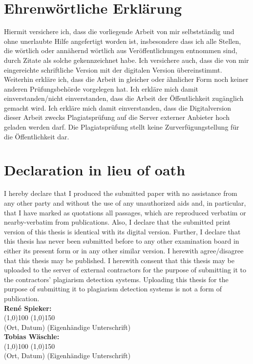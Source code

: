 \clearpage

\section*{Ehrenwörtliche Erklärung}
Hiermit versichere ich, dass die vorliegende Arbeit von mir selbstständig und 
ohne unerlaubte Hilfe angefertigt worden ist, insbesondere dass ich alle Stellen, die wörtlich oder annähernd wörtlich aus Veröffentlichungen entnommen sind, durch Zitate als solche gekennzeichnet habe. Ich versichere auch, dass die von mir eingereichte schriftliche Version mit der digitalen Version übereinstimmt. 
Weiterhin erkläre ich, dass die Arbeit in gleicher oder ähnlicher Form noch keiner anderen Prüfungsbehörde vorgelegen hat. Ich erkläre mich damit einverstanden/nicht einverstanden, dass die Arbeit der Öffentlichkeit zugänglich gemacht wird. Ich erkläre mich damit einverstanden, dass die Digitalversion dieser Arbeit zwecks Plagiatsprüfung auf die Server externer Anbieter hoch geladen werden darf. Die Plagiatsprüfung stellt keine Zurverfügungstellung für die Öffentlichkeit dar.\section*{Declaration in lieu of oath}
I hereby declare that I produced the submitted paper with no assistance from any other party and without the use of any unauthorized aids and, in particular, that I have marked as quotations all passages, which are reproduced verbatim or nearby-verbatim from publications. Also, I declare that the submitted print version of this thesis is identical with  its digital version. Further, I declare that this thesis has never been submitted before to any other examination board in either its present form or in any other similar version. I herewith agree/disagree that this thesis may be published. 
I herewith consent that this thesis may be uploaded to the server of external contractors for the purpose of submitting it to the contractors’ plagiarism detection systems. Uploading this thesis for the purpose of submitting it to plagiarism detection systems is not a form of publication.\\[0.5cm]
\textbf{René Spieker:}\\[1cm]
\line(1,0){100} \hfill \line(1,0){150}\\
(Ort, Datum) \hfill (Eigenhändige Unterschrift)\\[1cm]
\textbf{Tobias Wäschle:}\\[1cm]
\line(1,0){100} \hfill \line(1,0){150}\\
(Ort, Datum) \hfill (Eigenhändige Unterschrift)






